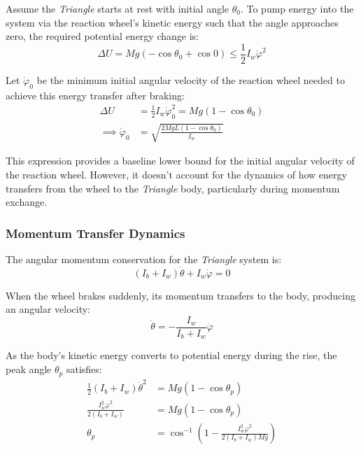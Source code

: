 \documentclass{article}
\begin{document}
Assume the \textit{Triangle} starts at rest with initial angle $\theta_{0}$. To pump energy into the system via the reaction wheel's kinetic energy such that the angle approaches zero, the required potential energy change is:
\begin{equation*}
  \Delta U = Mg(-\cos\theta_{0}+\cos0) \leq \frac{1}{2}I_{w}\dot{\varphi}^{2}
\end{equation*}

Let $\dot{\varphi}_{0}$ be the minimum initial angular velocity of the reaction wheel needed to achieve this energy transfer after braking:
\begin{equation*}
  \begin{split}
    \Delta U &= \frac{1}{2}I_{w}\dot{\varphi}_{0}^{2} = Mg(1-\cos\theta_{0})\\
    \implies \dot\varphi_{0} &= \sqrt{\frac{2MgL(1-\cos\theta_{0})}{I_{w}}}
  \end{split}
\end{equation*}

This expression provides a baseline lower bound for the initial angular velocity of the reaction wheel. However, it doesn't account for the dynamics of how energy transfers from the wheel to the \textit{Triangle} body, particularly during momentum exchange.

\subsubsection*{Momentum Transfer Dynamics}

The angular momentum conservation for the \textit{Triangle} system is:
\begin{equation*}
  (I_{b} + I_{w})\dot{\theta} + I_{w}\dot{\varphi} = 0
\end{equation*}

When the wheel brakes suddenly, its momentum transfers to the body, producing an angular velocity:
\begin{equation*}
  \dot{\theta} = -\frac{I_{w}}{I_{b} + I_{w}}\dot{\varphi}
\end{equation*}

As the body's kinetic energy converts to potential energy during the rise, the peak angle $\theta_{p}$ satisfies:
\begin{equation*}
  \begin{split}
    \frac{1}{2}(I_{b} + I_{w})\dot{\theta}^{2} &= Mg(1 - \cos\theta_{p})\\
    \frac{I_{w}^{2}\dot{\varphi}^{2}}{2(I_{b} + I_{w})} &= Mg(1 - \cos\theta_{p})\\
    \theta_{p} &= \cos^{-1}\left(1 - \frac{I_{w}^{2}\dot{\varphi}^{2}}{2(I_{b} + I_{w})Mg}\right)
  \end{split}
\end{equation*}
\end{document}

